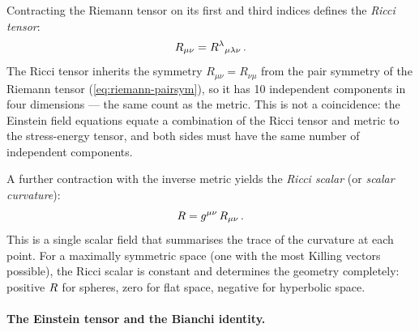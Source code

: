 Contracting the Riemann tensor on its first and third indices defines the
\emph{Ricci tensor}:
%
\begin{equation}
  R_{\mu\nu} = R^{\lambda}{}_{\mu \lambda \nu} \,.
  \label{eq:ricci-def}
\end{equation}
%
The Ricci tensor inherits the symmetry $R_{\mu\nu} = R_{\nu\mu}$ from the
pair symmetry of the Riemann tensor (\cref{eq:riemann-pairsym}), so it has 10
independent components in four dimensions --- the same count as the metric.
This is not a coincidence: the Einstein field equations equate a combination of
the Ricci tensor and metric to the stress-energy tensor, and both sides must
have the same number of independent components.

A further contraction with the inverse metric yields the \emph{Ricci scalar}
(or \emph{scalar curvature}):
%
\begin{equation}
  R = g^{\mu\nu}\, R_{\mu\nu} \,.
  \label{eq:ricci-scalar-def}
\end{equation}
%
This is a single scalar field that summarises the trace of the curvature at
each point.  For a maximally symmetric space (one with the most Killing vectors
possible), the Ricci scalar is constant and determines the geometry completely:
positive $R$ for spheres, zero for flat space, negative for
hyperbolic space.

\paragraph{The Einstein tensor and the Bianchi identity.}

